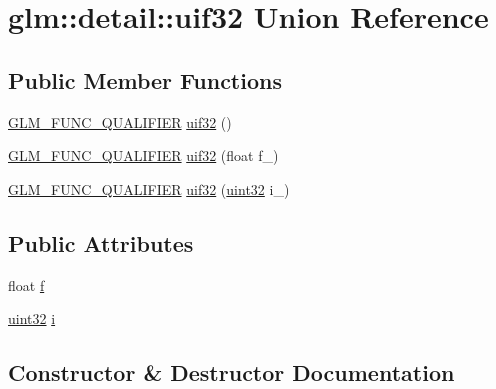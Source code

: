 \hypertarget{unionglm_1_1detail_1_1uif32}{}\section{glm\+:\+:detail\+:\+:uif32 Union Reference}
\label{unionglm_1_1detail_1_1uif32}
\subsection*{Public Member Functions}
\begin{DoxyCompactItemize}
\item 
\hyperlink{setup_8hpp_a33fdea6f91c5f834105f7415e2a64407}{G\+L\+M\+\_\+\+F\+U\+N\+C\+\_\+\+Q\+U\+A\+L\+I\+F\+I\+ER} \hyperlink{unionglm_1_1detail_1_1uif32_a185c257ac32e21727191ba7e52d97e3e}{uif32} ()
\item 
\hyperlink{setup_8hpp_a33fdea6f91c5f834105f7415e2a64407}{G\+L\+M\+\_\+\+F\+U\+N\+C\+\_\+\+Q\+U\+A\+L\+I\+F\+I\+ER} \hyperlink{unionglm_1_1detail_1_1uif32_a0d6e08c93b3d52c01e45864ff689c426}{uif32} (float f\+\_\+)
\item 
\hyperlink{setup_8hpp_a33fdea6f91c5f834105f7415e2a64407}{G\+L\+M\+\_\+\+F\+U\+N\+C\+\_\+\+Q\+U\+A\+L\+I\+F\+I\+ER} \hyperlink{unionglm_1_1detail_1_1uif32_aee424b46f48baa812572c015ec8bf434}{uif32} (\hyperlink{namespaceglm_1_1detail_ade6cfbf377022aaa391af8cd50489222}{uint32} i\+\_\+)
\end{DoxyCompactItemize}
\subsection*{Public Attributes}
\begin{DoxyCompactItemize}
\item 
float \hyperlink{unionglm_1_1detail_1_1uif32_a5f697f84c5a8ec72c2f3a4f705f5bde8}{f}
\item 
\hyperlink{namespaceglm_1_1detail_ade6cfbf377022aaa391af8cd50489222}{uint32} \hyperlink{unionglm_1_1detail_1_1uif32_a981c1c59e160db23c73908cd7e629229}{i}
\end{DoxyCompactItemize}


\subsection{Constructor \& Destructor Documentation}
\mbox{\label{unionglm_1_1detail_1_1uif32_a185c257ac32e21727191ba7e52d97e3e}} 

